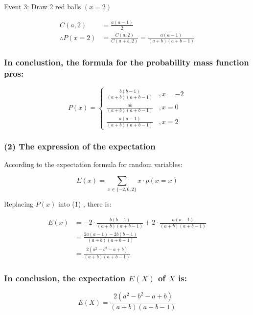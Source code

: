 \documentclass[
]{article}
\begin{document}
Event 3: Draw 2 red balls \((x=2)\)

\[
\begin{aligned}
C(a, 2) & =\frac{a(a-1)}{2} \\
\therefore P(x=2) & =\frac{C(a, 2)}{C(a+b, 2)}=\frac{a(a-1)}{(a+b)(a+b-1)}
\end{aligned}
\]

\subsubsection{In conclustion, the formula for the probability mass
function
pros:}\label{in-conclustion-the-formula-for-the-probability-mass-function-pros}

\[
P(x)= \begin{cases}\frac{b(b-1)}{(a+b)(a+b-1)} & , x=-2 \\ \frac{a b}{(a+b)(a+b-1)} & , x=0 \\ \frac{a(a-1)}{(a+b)(a+b-1)} & , x=2\end{cases}
\]

\subsubsection{(2) The expression of the
expectation}\label{the-expression-of-the-expectation}

According to the expectation formula for random variables:

\[
\begin{equation*}
E(x)=\sum_{x \in\{-2,0,2\}} x \cdot p(x=x) \tag{1}
\end{equation*}
\]

Replacing \(P(x)\) into (1) , there is:

\[
\begin{align*}
E(x) & =-2 \cdot \frac{b(b-1)}{(a+b)(a+b-1)}+2 \cdot \frac{a(a-1)}{(a+b)(a+b-1)} \\
& =\frac{2 a(a-1)-2 b(b-1)}{(a+b)(a+b-1)} \\
& =\frac{2\left(a^{2}-b^{2}-a+b\right)}{(a+b)(a+b-1)} \tag{2}
\end{align*}
\]

\subsubsection{\texorpdfstring{In conclusion, the expectation \(E(X)\)
of \(X\)
is:}{In conclusion, the expectation E(X) of X is:}}\label{in-conclusion-the-expectation-ex-of-x-is}

\[
E(X)=\frac{2\left(a^{2}-b^{2}-a+b\right)}{(a+b)(a+b-1)}
\]
\end{document}
